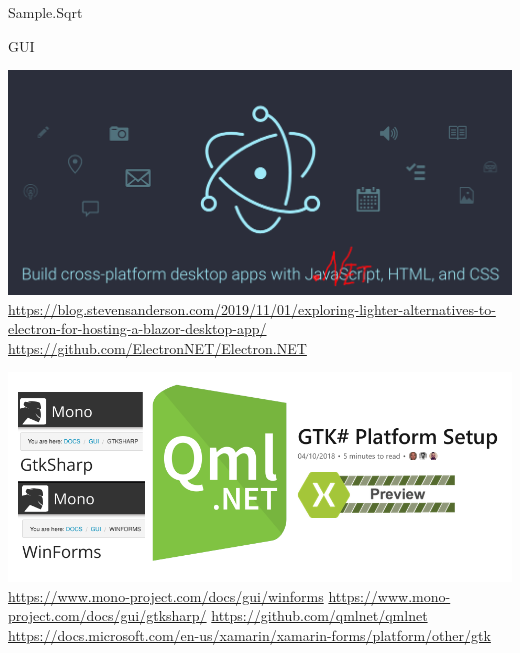 \documentclass[utf8x]{beamer}
\begin{document}
\begin{frame}
    \begin{center}
        \ttfamily
        \LARGE
        Sample.Sqrt
    \end{center}
\end{frame}


\begin{frame}
    \begin{center}
        \LARGE \textrm{GUI}
    \end{center}
\end{frame}

\begin{frame}
    \centering
    \includegraphics[width=\textwidth]{nelectron.png}
    \tiny\url{https://blog.stevensanderson.com/2019/11/01/exploring-lighter-alternatives-to-electron-for-hosting-a-blazor-desktop-app/}
    \tiny\url{https://github.com/ElectronNET/Electron.NET}
\end{frame}

\begin{frame}
    \centering
    \includegraphics[width=\textwidth]{monogui.png}
    \tiny\url{https://www.mono-project.com/docs/gui/winforms}
    \tiny\url{https://www.mono-project.com/docs/gui/gtksharp/}
    \tiny\url{https://github.com/qmlnet/qmlnet}
    \tiny\url{https://docs.microsoft.com/en-us/xamarin/xamarin-forms/platform/other/gtk}
\end{frame}
\end{document}
